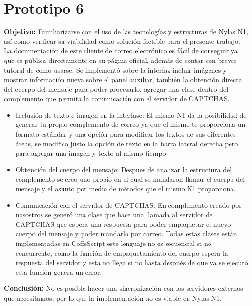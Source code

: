 \documentclass[12pt,oneside,onecolumn,openany]{report}
\begin{document}
\section{Prototipo 6}
\textbf{Objetivo:} Familiarizarse con el uso de las tecnologías y estructuras de Nylas N1, así como verificar su viabilidad como solución factible para el presente trabajo.\\
La documentación de este cliente de correo electrónico es fácil de conseguir ya que es pública directamente en su página oficial, además de contar con breves tutoral de como usarse.
Se implementó sobre la interfaz incluir imágenes y mostrar información nueva sobre el panel auxiliar, también la obtención directa del cuerpo del mensaje para poder procesarlo, agregar una clase dentro del complemento que permita la comunicación con el servidor de CAPTCHAS.

\begin{itemize}
 \item Inclusión de texto e imagen en la interfase: El mismo N1 da la posibilidad de generar tu propio complemento de correo ya que el mismo te proporciona un formato estándar y una opción para modificar los textos de sus diferentes áreas, se modifico justo la opción de texto en la barra lateral derecha pero para agregar una imagen y texto al mismo tiempo.
 \item Obtención del cuerpo del mensaje: Despues de analizar la estructura del complemento se creo uno propio en el cual se mandaron llamar el cuerpo del mensaje y el asunto por medio de métodos que el mismo N1 proporciona.
 \item Comunicación con el servidor de CAPTCHAS: En complemento creado por nosostros se generó una clase que hace una llamada al servidor de CAPTCHAS que espera una respuesta para poder empaquetar el nuevo cuerpo del mensaje y poder mandarlo por correo. Todas estas clases están implementadas en CoffeScript este lenguaje no es secuencial si no concurrente, como la función de empaquetamiento del cuerpo espera la respuesta del servidor y esta no llega si no hasta después de que ya se ejecutó esta función genera un error.
\end{itemize}
\textbf{Conclusión:} No es posible hacer una sincronización con los servidores externos que necesitamos, por lo que la implementación no es viable en Nylas N1.
\end{document}
